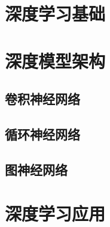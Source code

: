 \documentclass[11pt,oneside]{book}
\begin{document}


\tableofcontents

\part{深度学习基础}










\part{深度模型架构}
\chapter{卷积神经网络}





\chapter{循环神经网络}





\chapter{图神经网络}



\part{深度学习应用}



\begin{appendices}
	
\end{appendices}
\end{document}
